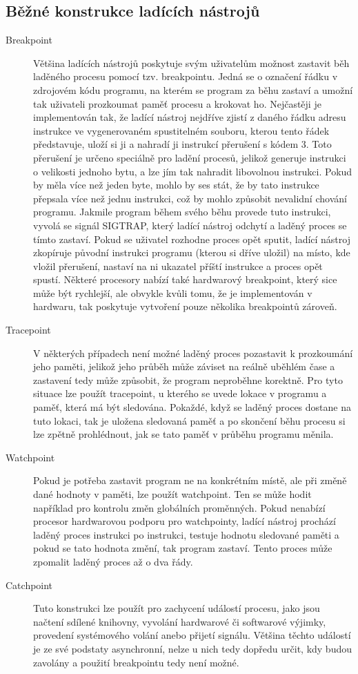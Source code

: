 \documentclass[bc,male,java,dept460]{diploma}						%
\begin{document}
	\subsection{Běžné konstrukce ladících nástrojů}
		\begin{description}
			\item[Breakpoint]
				Většina ladících nástrojů poskytuje svým uživatelům možnost zastavit běh laděného procesu pomocí tzv. breakpointu.
				Jedná se o označení řádku v zdrojovém kódu programu, na kterém se program za běhu zastaví a umožní tak uživateli prozkoumat paměť procesu a krokovat ho.
				Nejčastěji je implementován tak, že ladící nástroj nejdříve zjistí z daného řádku adresu instrukce ve vygenerovaném spustitelném souboru, kterou tento
				řádek představuje, uloží si ji a nahradí ji instrukcí přerušení s kódem 3. Toto přerušení je určeno speciálně pro ladění procesů, jelikož generuje
				instrukci o velikosti jednoho bytu, a lze jím tak nahradit libovolnou instrukci\cite[306]{intel}. Pokud by měla více než jeden byte, mohlo by ses
				stát, že by tato instrukce přepsala více než jednu instrukci, což by mohlo způsobit nevalidní chování programu. Jakmile program během svého běhu
				provede tuto instrukci, vyvolá se signál SIGTRAP, který ladící nástroj odchytí a laděný proces se tímto zastaví. Pokud se uživatel rozhodne proces
				opět sputit, ladící nástroj zkopíruje původní instrukci programu (kterou si dříve uložil) na místo, kde vložil přerušení, nastaví na ni ukazatel
				příští instrukce a proces opět spustí.
				Některé procesory nabízí také hardwarový breakpoint, který sice může být rychlejší, ale obvykle kvůli tomu, že je implementován v hardwaru, tak poskytuje
				vytvoření pouze několika breakpointů zároveň.
			\item[Tracepoint]
				V některých případech není možné laděný proces pozastavit k prozkoumání jeho paměti, jelikož jeho průběh může záviset na reálně uběhlém čase a zastavení
				tedy může způsobit, že program neproběhne korektně. Pro tyto situace lze použít tracepoint, u kterého se uvede lokace v programu a paměť, která má být
				sledována. Pokaždé, když se laděný proces dostane na tuto lokaci, tak je uložena sledovaná paměť a po skončení běhu procesu si lze zpětně prohlédnout,
				jak se tato paměť v průběhu programu měnila.
			\item[Watchpoint]
				Pokud je potřeba zastavit program ne na konkrétním místě, ale při změně dané hodnoty v paměti, lze použít watchpoint. Ten se může hodit například pro
				kontrolu změn globálních proměnných. Pokud nenabízí procesor hardwarovou podporu pro watchpointy, ladící nástroj prochází laděný proces instrukci po
				instrukci, testuje hodnotu sledované paměti a pokud se tato hodnota změní, tak program zastaví. Tento proces může zpomalit laděný proces až o
				dva řády\cite{gdb-watchpoint}.
			\item[Catchpoint]
				Tuto konstrukci lze použít pro zachycení událostí procesu, jako jsou načtení sdílené knihovny, vyvolání hardwarové či softwarové výjimky, provedení
				systémového volání anebo přijetí signálu. Většina těchto událostí je ze své podstaty asynchronní, nelze u nich tedy dopředu určit, kdy budou zavolány
				a použití breakpointu tedy není možné.
		\end{description}
\end{document}
